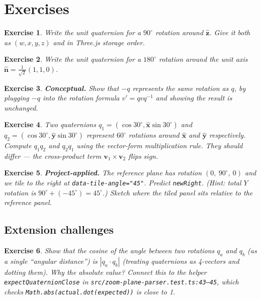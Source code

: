 \documentclass{article}
\newtheorem{exercise}{Exercise}
\begin{document}
\section{Exercises}

\begin{exercise}\label{ex1}
Write the unit quaternion for a $90^\circ$ rotation around $\hat{\mathbf{z}}$.
Give it both as $(w, x, y, z)$ and in Three.js storage order.
\end{exercise}

\begin{exercise}\label{ex2}
Write the unit quaternion for a $180^\circ$ rotation around the unit
axis $\hat{\mathbf{n}} = \frac{1}{\sqrt{2}}(1, 1, 0)$.
\end{exercise}

\begin{exercise}\label{ex3}
\textbf{Conceptual.} Show that $-q$ represents the same rotation as $q$,
by plugging $-q$ into the rotation formula $v' = q v q^{-1}$ and showing
the result is unchanged.
\end{exercise}

\begin{exercise}\label{ex4}
Two quaternions $q_1 = (\cos 30^\circ, \hat{\mathbf{x}} \sin 30^\circ)$ and
$q_2 = (\cos 30^\circ, \hat{\mathbf{y}} \sin 30^\circ)$ represent
$60^\circ$ rotations around $\hat{\mathbf{x}}$ and $\hat{\mathbf{y}}$
respectively. Compute $q_1 q_2$ and $q_2 q_1$ using the vector-form
multiplication rule. They should differ --- the cross-product term
$\mathbf{v}_1 \times \mathbf{v}_2$ flips sign.
\end{exercise}

\begin{exercise}\label{ex5}
\textbf{Project-applied.} The reference plane has rotation
$(0,\ 90^\circ,\ 0)$ and we tile to the right at \texttt{data-tile-angle="45"}.
Predict \texttt{newRight}. (Hint: total $Y$ rotation is
$90^\circ + (-45^\circ) = 45^\circ$.) Sketch where the tiled panel sits
relative to the reference panel.
\end{exercise}

\subsection*{Extension challenges}

\begin{exercise}\label{exA}
Show that the cosine of the angle between two rotations $q_a$ and $q_b$
(as a single ``angular distance'') is $|q_a \cdot q_b|$ (treating
quaternions as 4-vectors and dotting them). Why the absolute value?
Connect this to the helper \texttt{expectQuaternionClose} in
\texttt{src/zoom-plane-parser.test.ts:43--45}, which checks
\texttt{Math.abs(actual.dot(expected))} is close to 1.
\end{exercise}
\end{document}
